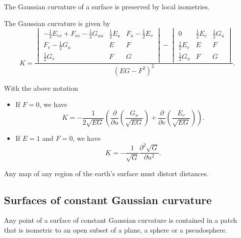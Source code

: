 \begin{theorem}
  The Gaussian curvature of a surface is preserved by local isometries.
\end{theorem}

\begin{corollary}
  The Gaussian curvature is given by
  \[
    K = \frac{
      \begin{vmatrix}
        -\frac{1}{2} E_{vv} + F_{uv} - \frac{1}{2} G_{uu} & \frac{1}{2} E_u & F_u - \frac{1}{2} E_v \\
        F_v - \frac{1}{2} G_u & E & F \\
        \frac{1}{2} G_v & F & G
      \end{vmatrix}
      -
      \begin{vmatrix}
        0 & \frac{1}{2} E_v & \frac{1}{2} G_u \\
        \frac{1}{2} E_v & E & F \\
        \frac{1}{2} G_u & F & G
      \end{vmatrix}
    }{
      (EG - F^2)^2
    }
    .
  \]
\end{corollary}

\begin{corollary}
  With the above notation
  \begin{itemize}
    \item If $F = 0$, we have
    \[
      K = -\frac{1}{2\sqrt{EG}}\left(
        \frac{\partial}{\partial u} \left(\frac{G_u}{\sqrt{EG}}\right)
        + \frac{\partial}{\partial v} \left(\frac{E_v}{\sqrt{EG}}\right)
      \right).
    \]
    \item If $E = 1$ and $F = 0$, we have
    \[
      K = - \frac{1}{\sqrt{G}} \frac{\partial^2 \sqrt{G}}{\partial u^2}.
    \]
  \end{itemize}
\end{corollary}

\begin{proposition}
  Any map of any region of the earth's surface must distort distances.
\end{proposition}

\subsection{Surfaces of constant Gaussian curvature}

\begin{theorem}
  Any point of a surface of constant Gaussian curvature is contained in a patch
  that is isometric to an open subset of a plane, a sphere or a pseudosphere.
\end{theorem}

